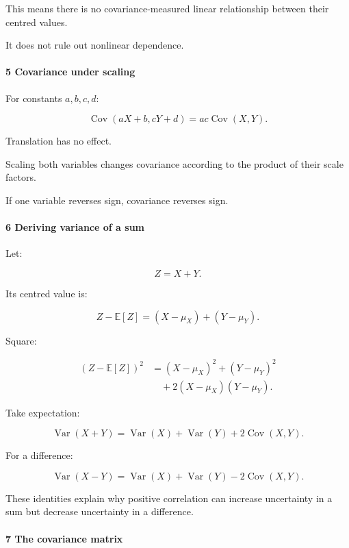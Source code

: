 This means there is no covariance-measured linear relationship between their centred values.

It does not rule out nonlinear dependence.

\paragraph{5 Covariance under scaling}\label{covariance-under-scaling}

For constants \(a,b,c,d\):

\[
 \boxed{ \operatorname{Cov}(aX+b,cY+d) = ac\operatorname{Cov}(X,Y) }.
\]

Translation has no effect.

Scaling both variables changes covariance according to the product of their scale factors.

If one variable reverses sign, covariance reverses sign.

\paragraph{6 Deriving variance of a sum}\label{deriving-variance-of-a-sum}

Let:

\[
 Z=X+Y.
\]

Its centred value is:

\[
 Z-\mathbb E[Z] = (X-\mu_X)+(Y-\mu_Y).
\]

Square:

\[
 \begin{aligned} (Z-\mathbb E[Z])^2 &=(X-\mu_X)^2+(Y-\mu_Y)^2\\ &\quad+2(X-\mu_X)(Y-\mu_Y). \end{aligned}
\]

Take expectation:

\[
 \boxed{ \operatorname{Var}(X+Y) = \operatorname{Var}(X)+ \operatorname{Var}(Y)+ 2\operatorname{Cov}(X,Y) }.
\]

For a difference:

\[
 \boxed{ \operatorname{Var}(X-Y) = \operatorname{Var}(X)+ \operatorname{Var}(Y)- 2\operatorname{Cov}(X,Y) }.
\]

These identities explain why positive correlation can increase uncertainty in a sum but decrease uncertainty in a difference.

\paragraph{7 The covariance matrix}\label{the-covariance-matrix}


